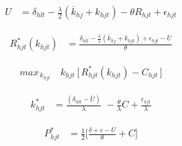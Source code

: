 \documentclass[12pt]{article}
\begin{document}



\begin{align*}
U &= \delta_{hlt} - \frac{\lambda}{2} (\overline{k}_{hj} + k_{hjt}) - \theta R_{hjt}   + \epsilon_{hjt}  
\end{align*}

\begin{align*}
\label{eq:rent}
R_{hjt}^{*}(k_{hjt}) &= \frac{ \delta_{hlt} - \frac{\lambda}{2} (\overline{k}_{hj} + k_{hjt}) + \epsilon_{hjt} - \overline{U}}{\theta}
\end{align*}


\begin{align*}
max_{\,k_{hjt}} \,\,\,\,\,\,  k_{hjt} \, \Big[ \, R_{hjt}^{*}(k_{hjt}) - C_{hjt} \, \Big ]
\end{align*}


\begin{align*}
k_{hjt}^{*} &= \frac{(\delta_{hlt} - \overline{U})}{\lambda} \,\, - \frac{\theta}{\lambda}C + \frac{\epsilon_{hjt}}{\lambda}
\end{align*}

\begin{align*}
P_{hjt}^{*}  &= \frac{1}{2} \Big [ \frac{\delta + \epsilon - \overline{U} }{\theta}  + C \Big ] 
\end{align*}






\end{document}
